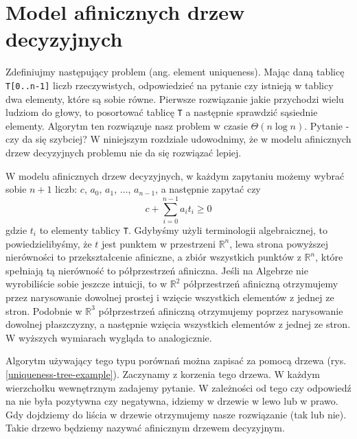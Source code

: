 \section{Model afinicznych drzew decyzyjnych}

\label{sec:elementuniqueness}

Zdefiniujmy następujący problem (ang. element uniqueness).
Mając daną tablicę \texttt{T[0..n-1]} liczb rzeczywistych, odpowiedzieć na pytanie czy istnieją w tablicy dwa elementy, które są sobie równe.
Pierwsze rozwiązanie jakie przychodzi wielu ludziom do głowy, to posortować tablicę \texttt{T} a następnie sprawdzić sąsiednie elementy.
Algorytm ten rozwiązuje nasz problem w czasie $\Theta(n \log n)$.
Pytanie - czy da się szybciej?
W niniejszym rozdziale udowodnimy, że w modelu afinicznych drzew decyzyjnych problemu nie da się rozwiązać lepiej.

W modelu afinicznych drzew decyzyjnych, w każdym zapytaniu możemy wybrać sobie $n+1$ liczb: $c$, $a_0$, $a_1$, $\dots$, $a_{n-1}$, a następnie zapytać czy
\[
 c + \sum_{i=0}^{n-1} a_i t_i \geq 0
\]
gdzie $t_i$ to elementy tablicy \texttt{T}.
Gdybyśmy użyli terminologii algebraicznej, to powiedzielibyśmy, że $t$ jest punktem w przestrzeni $\mathbb{R}^n$, lewa strona powyższej nierówności to przekształcenie afiniczne,
a zbiór wszystkich punktów z $\mathbb{R}^n$, które spełniają tą nierówność to półprzestrzeń afiniczna.
Jeśli na Algebrze nie wyrobiliście sobie jeszcze intuicji, to w $\mathbb{R}^2$ półprzestrzeń afiniczną otrzymujemy przez narysowanie dowolnej prostej i wzięcie wszystkich elementów z jednej ze stron.
Podobnie w $\mathbb{R}^3$ półprzestrzeń afiniczną otrzymujemy poprzez narysowanie dowolnej płaszczyzny, a następnie wzięcia wszystkich elementów z jednej ze stron.
W wyższych wymiarach wygląda to analogicznie.

Algorytm używający tego typu porównań można zapisać za pomocą drzewa (rys. \ref{uniqueness-tree-example}).
Zaczynamy z korzenia tego drzewa.
W każdym wierzchołku wewnętrznym zadajemy pytanie.
W zależności od tego czy odpowiedź na nie była pozytywna czy negatywna, idziemy w drzewie w lewo lub w prawo.
Gdy dojdziemy do liścia w drzewie otrzymujemy nasze rozwiązanie (tak lub nie).
Takie drzewo będziemy nazywać afinicznym drzewem decyzyjnym.

